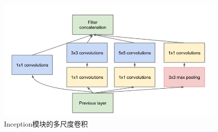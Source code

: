 \begin{figure}[h]
  \centering
  \includegraphics[width=0.75\linewidth]{Img/Inception.png}
  \caption{Inception模块的多尺度卷积\cite{szegedy2015going}}
  \label{fig:Inception}
\end{figure}
